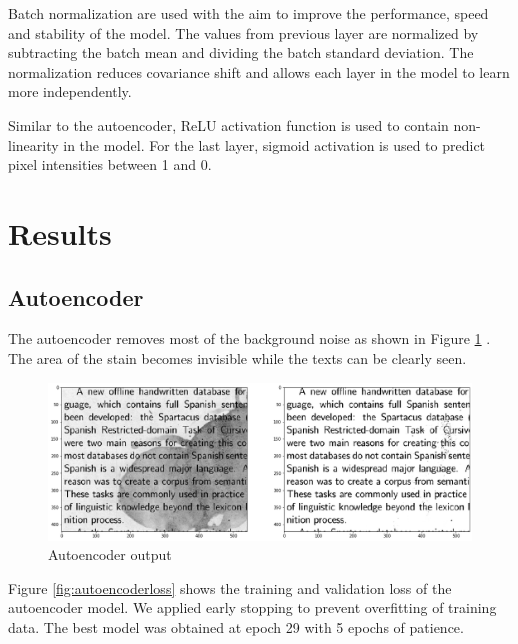 \documentclass[10pt,twocolumn,letterpaper]{article}
\begin{document}
    Batch normalization are used with the aim to improve the performance, speed and stability of the model. The values from previous layer are normalized by subtracting the batch mean and dividing the batch standard deviation. The normalization reduces covariance shift and allows each layer in the model to learn more independently.
    
    Similar to the autoencoder, ReLU activation function is used to contain non-linearity in the model. For the last layer, sigmoid activation is used to predict pixel intensities between 1 and 0.
\section{Results}

\subsection{Autoencoder}

The autoencoder removes most of the background noise as shown in Figure \ref{fig:autoencoder} . The area of the stain becomes invisible while the texts can be clearly seen.
\begin{figure}[h!]
    \centering
    \includegraphics[width=\columnwidth]{images/autoencoder.png}
    \caption{Autoencoder output}
    \label{fig:autoencoder}
\end{figure}

Figure \ref{fig:autoencoderloss} shows the training and validation loss of the autoencoder model. We applied early stopping to prevent overfitting of training data. The best model was obtained at epoch 29 with 5 epochs of patience.
\end{document}
